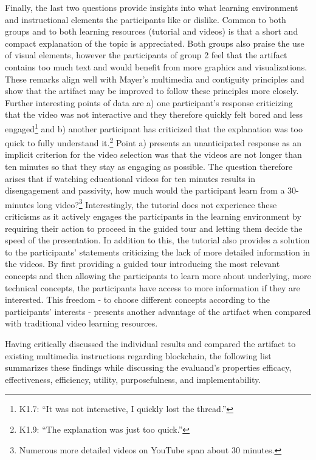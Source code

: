 Finally, the last two questions provide insights into what learning environment and instructional elements the participants like or dislike. Common to both groups and to both learning resources (tutorial and videos) is that a short and compact explanation of the topic is appreciated. Both groups also praise the use of visual elements, however the participants of group 2 feel that the artifact contains too much text and would benefit from more graphics and visualizations. These remarks align well with Mayer's multimedia and contiguity principles and show that the artifact may be improved to follow these principles more closely. Further interesting points of data are a) one participant's response criticizing that the video was not interactive and they therefore quickly felt bored and less engaged\footnote{K1.7: \enquote{It was not interactive, I quickly lost the thread.}} and b) another participant has criticized that the explanation was too quick to fully understand it.\footnote{K1.9: \enquote{The explanation was just too quick.} } Point a) presents an unanticipated response as an implicit criterion for the video selection was that the videos are not longer than ten minutes so that they stay as engaging as possible. The question therefore arises that if watching educational videos for ten minutes results in disengagement and passivity, how much would the participant learn from a 30-minutes long video?\footnote{Numerous more detailed videos on YouTube span about 30 minutes.} Interestingly, the tutorial does not experience these criticisms as it actively engages the participants in the learning environment by requiring their action to proceed in the guided tour and letting them decide the speed of the presentation. In addition to this, the tutorial also provides a solution to the participants' statements criticizing the lack of more detailed information in the videos. By first providing a guided tour introducing the most relevant concepts and then allowing the participants to learn more about underlying, more technical concepts, the participants have access to more information if they are interested. This freedom - to choose different concepts according to the participants' interests - presents another advantage of the artifact when compared with traditional video learning resources.

Having critically discussed the individual results and compared the artifact to existing multimedia instructions regarding blockchain, the following list summarizes these findings while discussing the evaluand's properties efficacy, effectiveness, efficiency, utility, purposefulness, and implementability.

